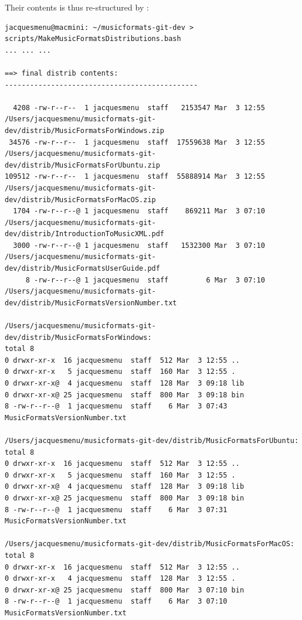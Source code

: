 Their contents is thus re-structured by :
\begin{lstlisting}[language=Terminal]
jacquesmenu@macmini: ~/musicformats-git-dev > scripts/MakeMusicFormatsDistributions.bash
... ... ...

==> final distrib contents:
----------------------------------------------

  4208 -rw-r--r--  1 jacquesmenu  staff   2153547 Mar  3 12:55 /Users/jacquesmenu/musicformats-git-dev/distrib/MusicFormatsForWindows.zip
 34576 -rw-r--r--  1 jacquesmenu  staff  17559638 Mar  3 12:55 /Users/jacquesmenu/musicformats-git-dev/distrib/MusicFormatsForUbuntu.zip
109512 -rw-r--r--  1 jacquesmenu  staff  55888914 Mar  3 12:55 /Users/jacquesmenu/musicformats-git-dev/distrib/MusicFormatsForMacOS.zip
  1704 -rw-r--r--@ 1 jacquesmenu  staff    869211 Mar  3 07:10 /Users/jacquesmenu/musicformats-git-dev/distrib/IntroductionToMusicXML.pdf
  3000 -rw-r--r--@ 1 jacquesmenu  staff   1532300 Mar  3 07:10 /Users/jacquesmenu/musicformats-git-dev/distrib/MusicFormatsUserGuide.pdf
     8 -rw-r--r--@ 1 jacquesmenu  staff         6 Mar  3 07:10 /Users/jacquesmenu/musicformats-git-dev/distrib/MusicFormatsVersionNumber.txt

/Users/jacquesmenu/musicformats-git-dev/distrib/MusicFormatsForWindows:
total 8
0 drwxr-xr-x  16 jacquesmenu  staff  512 Mar  3 12:55 ..
0 drwxr-xr-x   5 jacquesmenu  staff  160 Mar  3 12:55 .
0 drwxr-xr-x@  4 jacquesmenu  staff  128 Mar  3 09:18 lib
0 drwxr-xr-x@ 25 jacquesmenu  staff  800 Mar  3 09:18 bin
8 -rw-r--r--@  1 jacquesmenu  staff    6 Mar  3 07:43 MusicFormatsVersionNumber.txt

/Users/jacquesmenu/musicformats-git-dev/distrib/MusicFormatsForUbuntu:
total 8
0 drwxr-xr-x  16 jacquesmenu  staff  512 Mar  3 12:55 ..
0 drwxr-xr-x   5 jacquesmenu  staff  160 Mar  3 12:55 .
0 drwxr-xr-x@  4 jacquesmenu  staff  128 Mar  3 09:18 lib
0 drwxr-xr-x@ 25 jacquesmenu  staff  800 Mar  3 09:18 bin
8 -rw-r--r--@  1 jacquesmenu  staff    6 Mar  3 07:31 MusicFormatsVersionNumber.txt

/Users/jacquesmenu/musicformats-git-dev/distrib/MusicFormatsForMacOS:
total 8
0 drwxr-xr-x  16 jacquesmenu  staff  512 Mar  3 12:55 ..
0 drwxr-xr-x   4 jacquesmenu  staff  128 Mar  3 12:55 .
0 drwxr-xr-x@ 25 jacquesmenu  staff  800 Mar  3 07:10 bin
8 -rw-r--r--@  1 jacquesmenu  staff    6 Mar  3 07:10 MusicFormatsVersionNumber.txt
\end{lstlisting}

